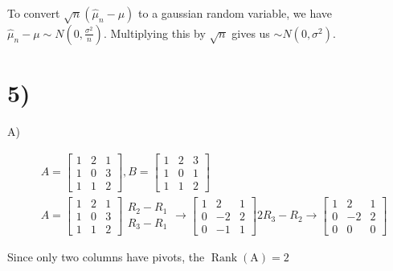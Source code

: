\documentclass[10pt]{article}
\begin{document}
To convert $\sqrt{n}\left(\hat{\mu}_{n}-\mu\right)$ to a gaussian random variable, we have $\hat{\mu}_{n}-\mu \sim N\left(0, \frac{\sigma^{2}}{n}\right)$. Multiplying this by $\sqrt{n}$ gives us $\sim N\left(0, \sigma^{2}\right)$.

\newpage
\section*{5)}
A)

$$
\begin{aligned}
& A=\left[\begin{array}{lll}
1 & 2 & 1 \\
1 & 0 & 3 \\
1 & 1 & 2
\end{array}\right], B=\left[\begin{array}{lll}
1 & 2 & 3 \\
1 & 0 & 1 \\
1 & 1 & 2
\end{array}\right] \\
& A=\left[\begin{array}{lll}
1 & 2 & 1 \\
1 & 0 & 3 \\
1 & 1 & 2
\end{array}\right] \begin{array}{l}
R_{2}-R_{1} \\
R_{3}-R_{1}
\end{array} \rightarrow\left[\begin{array}{ccc}
1 & 2 & 1 \\
0 & -2 & 2 \\
0 & -1 & 1
\end{array}\right] 2 R_{3}-R_{2} \rightarrow\left[\begin{array}{ccc}
1 & 2 & 1 \\
0 & -2 & 2 \\
0 & 0 & 0
\end{array}\right]
\end{aligned}
$$

Since only two columns have pivots, the $()=2$
\end{document}
